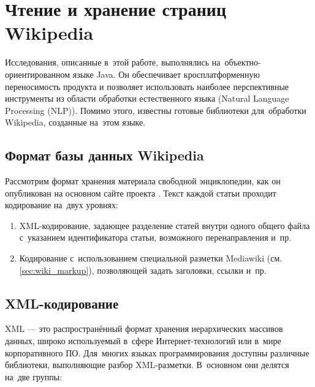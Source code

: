 \section{Чтение и хранение страниц Wikipedia}

Исследования, описанные в~этой работе, выполнялись на~объектно-ориентированном языке Java.
Он обеспечивает кросплатформенную переносимость продукта
и позволяет использовать наиболее перспективные инструменты из области обработки естественного языка (Natural Language Processing (NLP)\cite{textminingsurvey}).
Помимо этого, известны готовые библиотеки для~обработки Wikipedia, созданные на~этом языке.

\subsection{Формат базы данных Wikipedia}

Рассмотрим формат хранения материала свободной энциклопедии, 
как он опубликован на основном сайте проекта \cite{download}. 
Текст каждой статьи проходит кодирование на~двух уровнях:

\begin{enumerate}

\item {
XML-кодирование, задающее разделение статей внутри одного общего
файла с~указанием идентификатора статьи, возможного перенаправления и~пр.
}

\item{
Кодирование с~использованием специальной разметки Mediawiki (см. \ref{sec:wiki_markup}),
позволяющей задать заголовки, ссылки и~пр.
}

\end{enumerate}

\subsection{XML-кодирование}

XML --- это распространённый формат хранения иерархических массивов данных, 
широко используемый в~сфере Интернет-технологий или в~мире корпоративного ПО. 
Для~многих языках программирования доступны различные библиотеки, 
выполняющие разбор XML-разметки. 
В~основном они делятся на~две группы: 

